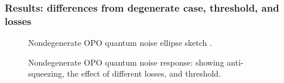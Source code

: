 \subsubsection{Results: differences from degenerate case, threshold, and losses}

\begin{figure}
	\centering
	\caption{Nondegenerate OPO quantum noise ellipse sketch .}
	\label{fig:nOPO_noise_ellipse}
\end{figure}


\begin{figure}
	\centering
	\caption{Nondegenerate OPO quantum noise response: showing anti-squeezing, the effect of different losses, and threshold. }
	\label{fig:nOPO_variances}
\end{figure}

